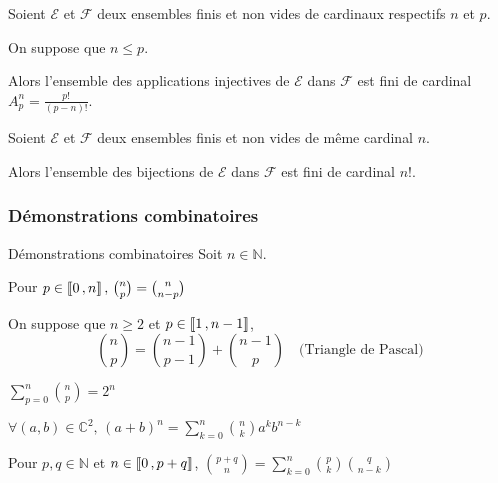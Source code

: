     \begin{prop}{}{}
        Soient $\mathcal{E}$ et $\mathcal{F}$ deux ensembles finis et non vides de cardinaux respectifs $n$ et $p$.

        On suppose que $n \leq p$.

        Alors l’ensemble des applications injectives de $\mathcal{E}$ dans $\mathcal{F}$ est fini de cardinal $A_p^n = \frac{p!}{(p-n)!}$.
    \end{prop}

    \begin{coro}{}{}
        Soient $\mathcal{E}$ et $\mathcal{F}$ deux ensembles finis et non vides de même cardinal $n$.

        Alors l’ensemble des bijections de $\mathcal{E}$ dans $\mathcal{F}$ est fini de cardinal $n!$.
    \end{coro}

    \subsubsection{Démonstrations combinatoires}

    \begin{prop}{Démonstrations combinatoires}{}
        Soit $n \in \mathbb{N}$.

        \begin{alors}
            \item Pour $p \in \left\llbracket 0 \, , n \right\rrbracket, \, \binom{n}{p} = \binom{n}{n-p}$
            \item On suppose que $n \geq 2$ et $p \in \left\llbracket 1 \, , n-1 \right\rrbracket$, \[ \binom{n}{p} = \binom{n-1}{p-1} + \binom{n-1}{p} \quad \text{(Triangle de Pascal)} \]
            \item $\sum\limits_{p=0}^n \binom{n}{p} = 2^n$
            \item $\forall (a,b) \in \mathbb{C}^2, \, (a+b)^n = \sum\limits_{k=0}^n \binom{n}{k} a^k b^{n-k}$
            \item Pour $p,q \in \mathbb{N}$ et $n \in \left\llbracket 0 \, , p+q \right\rrbracket$, $\binom{p+q}{n} = \sum\limits_{k=0}^n \binom{p}{k} \binom{q}{n-k}$
        \end{alors}
    \end{prop}

